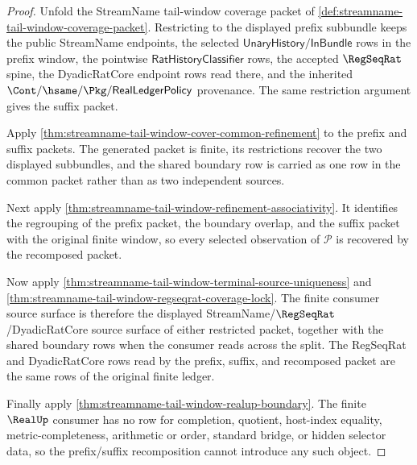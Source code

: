 \begin{proof}
Unfold the StreamName tail-window coverage packet of
\autoref{def:streamname-tail-window-coverage-packet}. Restricting to the
displayed prefix subbundle keeps the public StreamName endpoints, the selected
$\mathsf{UnaryHistory}/\mathsf{InBundle}$ rows in the prefix window, the
pointwise $\mathsf{RatHistoryClassifier}$ rows, the accepted $\RegSeqRat$
spine, the DyadicRatCore endpoint rows read there, and the inherited
$\Cont/\hsame/\Pkg/\mathsf{RealLedgerPolicy}$ provenance. The same restriction
argument gives the suffix packet.

Apply \autoref{thm:streamname-tail-window-cover-common-refinement} to the
prefix and suffix packets. The generated packet is finite, its restrictions
recover the two displayed subbundles, and the shared boundary row is carried as
one row in the common packet rather than as two independent sources.

Next apply \autoref{thm:streamname-tail-window-refinement-associativity}. It
identifies the regrouping of the prefix packet, the boundary overlap, and the
suffix packet with the original finite window, so every selected observation
of $\mathcal P$ is recovered by the recomposed packet.

Now apply \autoref{thm:streamname-tail-window-terminal-source-uniqueness} and
\autoref{thm:streamname-tail-window-regseqrat-coverage-lock}. The finite
consumer source surface is therefore the displayed
StreamName/$\RegSeqRat$/DyadicRatCore source surface of either restricted
packet, together with the shared boundary rows when the consumer reads across
the split. The RegSeqRat and DyadicRatCore rows read by the prefix, suffix,
and recomposed packet are the same rows of the original finite ledger.

Finally apply \autoref{thm:streamname-tail-window-realup-boundary}. The
finite $\RealUp$ consumer has no row for completion, quotient, host-index
equality, metric-completeness, arithmetic or order, standard bridge, or hidden
selector data, so the prefix/suffix recomposition cannot introduce any such
object.
\end{proof}

